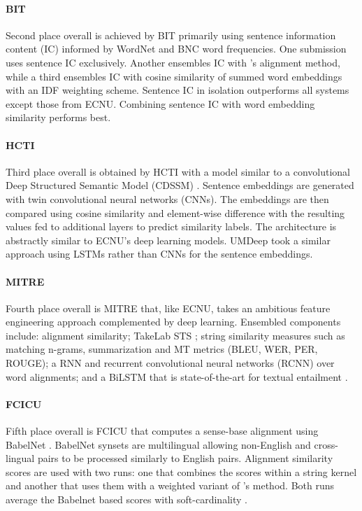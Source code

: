 \documentclass[11pt,a4paper]{article}
\begin{document}
\paragraph{BIT \textnormal{\cite{wu-EtAl:2017:SemEval1}}} Second place overall is achieved by BIT primarily using sentence information content (IC) informed by WordNet and BNC word frequencies. One submission uses sentence IC exclusively. Another ensembles IC with 's alignment method, while a third ensembles IC with cosine similarity of summed word embeddings with an IDF weighting scheme. Sentence IC in isolation outperforms all systems except those from ECNU. Combining sentence IC with word embedding similarity performs best.

\paragraph{HCTI \textnormal{\cite{shao:2017:SemEval}}} Third place overall is obtained by HCTI with a model similar to a convolutional Deep Structured Semantic Model (CDSSM) \cite{chenyunnug2015,Huang2013}. Sentence embeddings are generated with twin convolutional neural networks (CNNs). The embeddings are then compared using cosine similarity and element-wise difference with the resulting values fed to additional layers to predict similarity labels. The architecture is abstractly similar to ECNU's deep learning models. UMDeep \cite{barrow-peskov:2017:SemEval} took a similar approach using LSTMs rather than CNNs for the sentence embeddings. 

\paragraph{MITRE \textnormal{\cite{henderson-EtAl:2017:SemEval}}} Fourth place overall is MITRE that, like ECNU, takes an ambitious feature engineering approach complemented by deep learning. Ensembled components include: alignment similarity; TakeLab STS \cite{saric2012takelab}; string similarity measures such as matching n-grams, summarization and MT metrics (BLEU, WER, PER, ROUGE); a RNN and recurrent convolutional neural networks (RCNN) over word alignments; and a BiLSTM that is state-of-the-art for textual entailment \cite{qianchen2016}.

\paragraph{FCICU \textnormal{\cite{hassan-EtAl:2017:SemEval}}} Fifth place overall is FCICU that computes a sense-base alignment using BabelNet \cite{Navigli:2010:BBV:1858681.1858704}. BabelNet synsets are multilingual allowing non-English and cross-lingual pairs to be processed similarly to English pairs. Alignment similarity scores are used with two runs: one that combines the scores within a string kernel and another that uses them with a weighted variant of 's method. Both runs average the Babelnet based scores with soft-cardinality \cite{JimenezSergio2012}.
\end{document}
